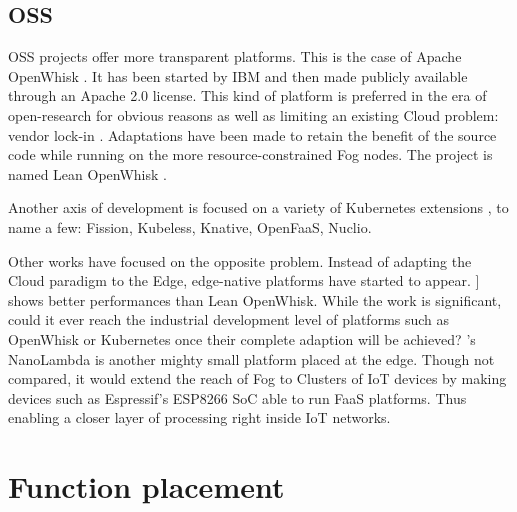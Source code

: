 \documentclass[11pt]{sdm}
\begin{document}
%    

\hypersetup{linkcolor=}
\subsection{\acrfull{OSS}}
\gls{OSS} projects offer more transparent platforms. This is the case of Apache OpenWhisk \cite{noauthor_apache_nodate}. It has been started by IBM and then made publicly available through an Apache 2.0 license. This kind of platform is preferred in the era of open-research for obvious reasons as well as limiting an existing Cloud problem: vendor lock-in \cite{kjorveziroski_iot_2021}. Adaptations have been made to retain the benefit of the source code while running on the more resource-constrained Fog nodes. The project is named Lean OpenWhisk \cite{breitgand_lean_2018}.

Another axis of development is focused on a variety of Kubernetes extensions \cite{bocci_secure_2021}, to name a few: Fission, Kubeless, Knative, OpenFaaS, Nuclio.

Other works have focused on the opposite problem. Instead of adapting the Cloud paradigm to the Edge, edge-native platforms have started to appear. \citet{pfandzelter_tinyfaas_2020}] shows better performances than Lean OpenWhisk. While the work is significant, could it ever reach the industrial development level of platforms such as OpenWhisk or Kubernetes once their complete adaption will be achieved? 's NanoLambda is another mighty small platform placed at the edge. Though not compared, it would extend the reach of Fog to Clusters of IoT devices by making devices such as Espressif's ESP8266 \gls{SoC} \cite{noauthor_esp8266_nodate} able to run \gls{FaaS} platforms. Thus enabling a closer layer of processing right inside IoT networks.

\section{Function placement}
\label{sec:placement}
\end{document}
